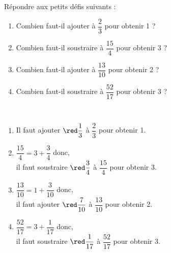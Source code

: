 \begin{exercice*}
   Répondre aux petits défis suivants :
   \begin{enumerate}
      \item Combien faut-il ajouter à $\dfrac23$ pour obtenir 1 ? \smallskip
      \item Combien faut-il soustraire à $\dfrac{15}4$ pour obtenir 3 ? \smallskip
      \item Combien faut-il ajouter à $\dfrac{13}{10}$ pour obtenir 2 ? \smallskip
      \item Combien faut-il soustraire à $\dfrac{52}{17}$ pour obtenir 3 ?
   \end{enumerate}
\end{exercice*}

\begin{corrige}
   \ \\ [-5mm]
   \begin{enumerate}
      \item Il faut ajouter $\red \dfrac13$ à $\dfrac23$ pour obtenir 1. \bigskip
      \item $\dfrac{15}{4} =3+\dfrac34$ donc, \\ [1mm]
         il faut soustraire $\red \dfrac34$ à $\dfrac{15}{4}$ pour obtenir 3. \bigskip
      \item $\dfrac{13}{10} =1+\dfrac{3}{10}$ donc, \\ [1mm]
         il faut ajouter $\red \dfrac{7}{10}$ à $\dfrac{13}{10}$ pour obtenir 2. \bigskip
      \item $\dfrac{52}{17} =3+\dfrac{1}{17}$ donc, \\ [1mm]
         il faut soustraire $\red \dfrac{1}{17}$ à $\dfrac{52}{17}$ pour obtenir 3. \bigskip
   \end{enumerate}
\end{corrige}